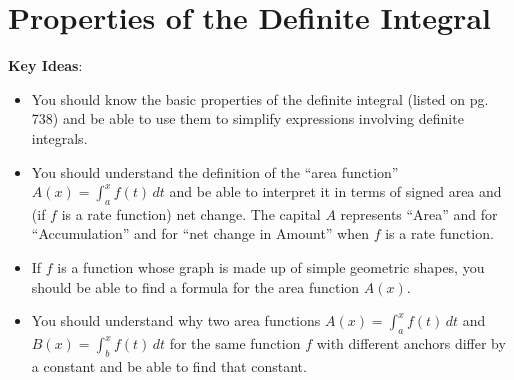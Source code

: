 \documentclass[main]{subfiles}
\begin{document}
\ifSubfilesClassLoaded{%
  \chaptermark{\chapterfive}
}{}

\section{Properties of the Definite Integral} \label{ws5-4}

\begin{problemonly}
    \begin{framed}

\textbf{Key Ideas}:

\begin{itemize}[topsep=0pt,partopsep=0pt,parsep=8pt,itemsep=0pt]

\item You should know the basic properties of the definite integral
  (listed on pg. 738) and be able to use them to simplify expressions
  involving definite integrals. 

\item You should understand the definition of the ``area function'' $A(x)=\displaystyle \int_a^x f(t)\,dt$
and be able to interpret it in terms of signed area and (if $f$ is
  a rate function) net change. The capital $A$ represents ``Area'' and 
  for ``Accumulation'' and for ``net change in Amount'' when $f$ is
  a rate function.

\item If $f$ is a function whose graph is made up of simple geometric
  shapes, you should be able to find a formula for the area function $A(x)$.

\item You should understand why two area functions $A(x)=\displaystyle \int_a^x f(t)\,dt$ and 
  $B(x)=\displaystyle \int_b^x f(t)\,dt$ for the same function $f$ with different anchors 
  differ by a constant and be able to find that constant.

\end{itemize}
\end{framed}
\end{problemonly}
\end{document}
